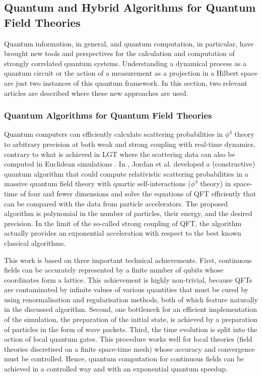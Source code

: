 \documentclass[epj,final]{svjour}
\begin{document}
\subsection{Quantum and Hybrid Algorithms for Quantum Field Theories}

Quantum information, in general, and quantum computation, in particular, have brought new tools and perspectives for the calculation and computation of strongly correlated quantum systems. Understanding a dynamical process as a quantum circuit or the action of a measurement as a projection in a Hilbert space are just two instances of this quantum framework. In this section, two relevant articles \cite{jordan2012quantum,lu2018simulations} are described where these new approaches are used.

\subsubsection{Quantum Algorithms for Quantum Field Theories\cite{jordan2012quantum}}

Quantum computers can efficiently calculate scattering probabilities in $\phi^{4}$ theory to arbitrary precision at both weak and strong coupling with real-time dynamics, contrary to what is achieved in LGT where the scattering data can also be computed in Euclidean simulations \cite{luscher1986volume,wiese1989identification,luscher1991signatures}. In \cite{jordan2012quantum}, Jordan et al. developed a (constructive) quantum algorithm that could compute relativistic scattering probabilities in a massive quantum field theory with quartic self-interactions ($\phi^{4}$ theory) in space-time of four and fewer dimensions and solve the equations of QFT efficiently that can be compared with the data from particle accelerators. The proposed algorithm is polynomial in the number of particles, their energy, and the desired precision. In the limit of the so-called strong coupling of QFT, the algorithm actually provides an exponential acceleration with respect to the best known classical algorithms.

This work is based on three important technical achievements. First, continuous fields can be accurately represented by a finite number of qubits whose coordinates form a lattice. This achievement is highly non-trivial, because QFTs are contaminated by infinite values of various quantities that must be cured by using renormalisation and regularisation methods, both of which feature naturally in the discussed algorithm. Second, one bottleneck for an efficient implementation of the simulation, the preparation of the initial state, is achieved by a preparation of particles in the form of wave packets. Third, the time evolution is split into the action of local quantum gates. This procedure works well for local theories (field theories discretised on a finite space-time mesh) whose accuracy and convergence must be controlled. Hence, quantum computation for continuous fields can be achieved in a controlled way and with an exponential quantum speedup.
\end{document}
